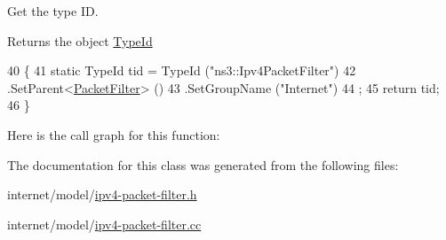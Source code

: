 Get the type ID. 

\begin{DoxyReturn}{Returns}
the object \hyperlink{classns3_1_1TypeId}{Type\+Id} 
\end{DoxyReturn}

\begin{DoxyCode}
40 \{
41   \textcolor{keyword}{static} TypeId tid = TypeId (\textcolor{stringliteral}{"ns3::Ipv4PacketFilter"})
42     .SetParent<\hyperlink{classns3_1_1PacketFilter_a4c9b19f4b91684d30d8a769489b534e7}{PacketFilter}> ()
43     .SetGroupName (\textcolor{stringliteral}{"Internet"})
44   ;
45   \textcolor{keywordflow}{return} tid;
46 \}
\end{DoxyCode}


Here is the call graph for this function\+:




The documentation for this class was generated from the following files\+:\begin{DoxyCompactItemize}
\item 
internet/model/\hyperlink{ipv4-packet-filter_8h}{ipv4-\/packet-\/filter.\+h}\item 
internet/model/\hyperlink{ipv4-packet-filter_8cc}{ipv4-\/packet-\/filter.\+cc}\end{DoxyCompactItemize}
